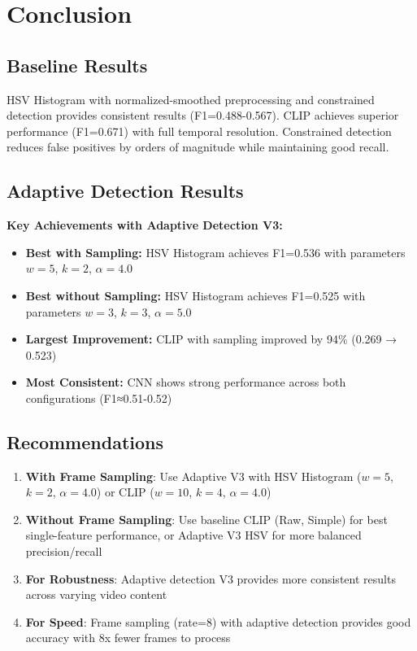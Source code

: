 \documentclass[11pt,a4paper]{article}
\begin{document}
\section{Conclusion}

\subsection{Baseline Results}
HSV Histogram with normalized-smoothed preprocessing and constrained detection provides consistent results (F1=0.488-0.567). CLIP achieves superior performance (F1=0.671) with full temporal resolution. Constrained detection reduces false positives by orders of magnitude while maintaining good recall.

\subsection{Adaptive Detection Results}

\colorbox{bestresult}{\parbox{\dimexpr\linewidth-2\fboxsep}{%
\textbf{Key Achievements with Adaptive Detection V3:}
\begin{itemize}
    \item \textbf{Best with Sampling:} HSV Histogram achieves F1=0.536 with parameters $w=5$, $k=2$, $\alpha=4.0$
    \item \textbf{Best without Sampling:} HSV Histogram achieves F1=0.525 with parameters $w=3$, $k=3$, $\alpha=5.0$
    \item \textbf{Largest Improvement:} CLIP with sampling improved by 94\% (0.269 → 0.523)
    \item \textbf{Most Consistent:} CNN shows strong performance across both configurations (F1≈0.51-0.52)
\end{itemize}
}}

\subsection{Recommendations}

\begin{enumerate}
    \item \textbf{With Frame Sampling}: Use Adaptive V3 with HSV Histogram ($w=5$, $k=2$, $\alpha=4.0$) or CLIP ($w=10$, $k=4$, $\alpha=4.0$)
    \item \textbf{Without Frame Sampling}: Use baseline CLIP (Raw, Simple) for best single-feature performance, or Adaptive V3 HSV for more balanced precision/recall
    \item \textbf{For Robustness}: Adaptive detection V3 provides more consistent results across varying video content
    \item \textbf{For Speed}: Frame sampling (rate=8) with adaptive detection provides good accuracy with 8x fewer frames to process
\end{enumerate}
\end{document}
